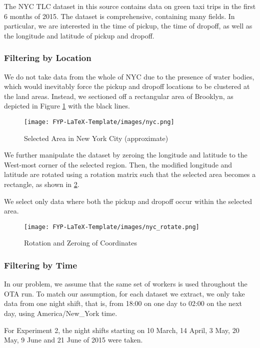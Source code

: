 \documentclass[urop]{socreport}
\begin{document}
The NYC TLC dataset in this source contains data on green taxi trips in the first 6 months of 2015. The dataset is comprehensive, containing many fields. In particular, we are interested in the time of pickup, the time of dropoff, as well as the longitude and latitude of pickup and dropoff. 

\subsubsection{Filtering by Location}
We do not take data from the whole of NYC due to the presence of water bodies, which would inevitably force the pickup and dropoff locations to be clustered at the land areas. Instead, we sectioned off a rectangular area of Brooklyn, as depicted in Figure \ref{fig:nyc} with the black lines.

\begin{figure}[h]
    \centering
    \texttt{[image: FYP-LaTeX-Template/images/nyc.png]}
    \caption{Selected Area in New York City (approximate)}
    \label{fig:nyc}
\end{figure}

We further manipulate the dataset by zeroing the longitude and latitude to the West-most corner of the selected region. Then, the modified longitude and latitude are rotated using a rotation matrix such that the selected area becomes a rectangle, as shown in \ref{fig:nycrotated}.

We select only data where both the pickup and dropoff occur within the selected area.

\begin{figure}
    \centering
    \texttt{[image: FYP-LaTeX-Template/images/nyc\_rotate.png]}
    \caption{Rotation and Zeroing of Coordinates}
    \label{fig:nycrotated}
\end{figure}

\subsubsection{Filtering by Time}
In our problem, we assume that the same set of workers is used throughout the OTA run. To match our assumption, for each dataset we extract, we only take data from one night shift, that is, from 18:00 on one day to 02:00 on the next day, using America/New\_York time. 

For Experiment 2, the night shifts starting on 10 March, 14 April, 3 May, 20 May, 9 June and 21 June of 2015 were taken.
\end{document}
